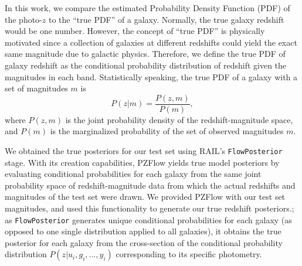 \documentclass[fleqn,usenatbib,useAMS]{mnras}
\newcommand{\PersonalTag}[3]{{\color{#2}{$^{#1}$ [#3}]}}
\newcommand{\aim}[1]{\PersonalTag{Alex}{violet}{#1}}
\newcommand{\alice}[1]{\PersonalTag{Alice}{olive}{#1}}
\newcommand{\cwr}[1]{{\color{black}{#1}}}
\begin{document}
In this work, we compare the estimated Probability Density Function (PDF) of the photo-$z$ to the ``true PDF'' of a galaxy. 
Normally, the true galaxy redshift would be one number. 
However, the concept of ``true PDF'' is physically motivated since a collection of galaxies at different redshifts could yield the exact same magnitude due to galactic physics. 
Therefore, we define the true PDF of galaxy redshift as the conditional probability distribution of redshift given the magnitudes in each band. 
Statistically speaking, the true PDF of a galaxy with a set of magnitudes $m$ is
\begin{equation}
    P(z|m) = \frac{P(z, m)}{P(m)},
\end{equation}
where $P(z, m)$ is the joint probability density of the redshift-magnitude space, and $P(m)$ is the marginalized probability of the set of observed magnitudes $m$.  \cwr{In this work we are using a simulated dataset with some $P(z, m)$ that may differ in practice from realistic $P(z, m)$ due to uncertainties in galaxy populations and their evolution.  However, since we use the simulation for both training and testing set, any limitations in the simulated sample would apply to both and would not induce a training-testing set mismatch.}

We obtained the true posteriors for our test set using RAIL's \texttt{FlowPosterior} stage. 
With its creation capabilities, PZFlow yields true model posteriors by evaluating conditional probabilities for each galaxy from the same joint probability space of redshift-magnitude data from which the actual redshifts and magnitudes of the test set were drawn. 
We provided PZFlow with our test set magnitudes, and used this functionality to generate our true redshift posteriors.;
as \texttt{FlowPosterior} generates unique conditional probabilities for each galaxy (as opposed to one single distribution applied to all galaxies), it obtains the true posterior for each galaxy from the cross-section of the conditional probability distribution $P(z|u_i,g_i,..., y_i)$ corresponding to its specific photometry. 
\end{document}
